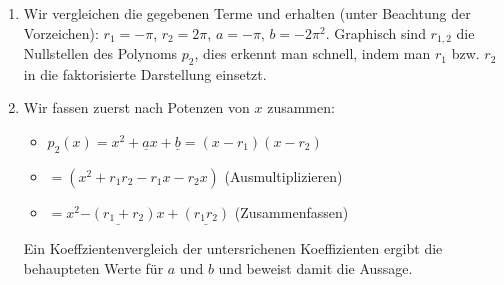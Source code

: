 \item

\begin{enumerate}

\item Wir vergleichen die gegebenen Terme und erhalten (unter Beachtung der Vorzeichen): $r_1 = -\pi$, $r_2 = 2\pi$, $a = -\pi$, $b = -2\pi^2$. Graphisch sind $r_{1,2}$ die Nullstellen des Polynoms $p_2$, dies erkennt man schnell, indem man $r_1$ bzw. $r_2$ in die faktorisierte Darstellung einsetzt.

\item Wir fassen zuerst nach Potenzen von $x$ zusammen:

\begin{itemize}
\item $p_2(x) = x^2 + \underline{a}x + \underline{b} = (x-r_1)(x-r_2)$
\item $= (x^2+r_1r_2-r_1x-r_2x)$ (Ausmultiplizieren)
\item $= x^2 \underline{-(r_1+r_2)}x+\underline{(r_1r_2)}$ (Zusammenfassen)
\end{itemize}

Ein Koeffzientenvergleich der untersrichenen Koeffizienten ergibt die behaupteten Werte für $a$ und $b$ und beweist damit die Aussage.

\end{enumerate}
